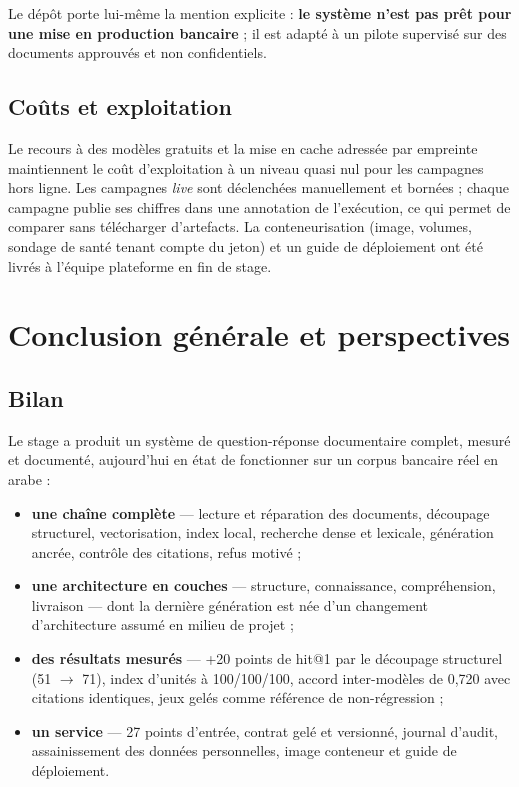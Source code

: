 \documentclass[a4paper,12pt]{report}
\begin{document}
Le dépôt porte lui-même la mention explicite : \textbf{le système n'est pas prêt pour une mise en
production bancaire} ; il est adapté à un pilote supervisé sur des documents approuvés et non
confidentiels.

\section{Coûts et exploitation}
Le recours à des modèles gratuits et la mise en cache adressée par empreinte maintiennent le coût
d'exploitation à un niveau quasi nul pour les campagnes hors ligne. Les campagnes \emph{live} sont
déclenchées manuellement et bornées ; chaque campagne publie ses chiffres dans une annotation de
l'exécution, ce qui permet de comparer sans télécharger d'artefacts. La conteneurisation (image,
volumes, sondage de santé tenant compte du jeton) et un guide de déploiement ont été livrés à
l'équipe plateforme en fin de stage.

\chapter*{Conclusion générale et perspectives}

\section*{Bilan}
Le stage a produit un système de question-réponse documentaire complet, mesuré et documenté,
aujourd'hui en état de fonctionner sur un corpus bancaire réel en arabe :

\begin{itemize}
  \item \textbf{une chaîne complète} — lecture et réparation des documents, découpage structurel,
        vectorisation, index local, recherche dense et lexicale, génération ancrée, contrôle des
        citations, refus motivé ;
  \item \textbf{une architecture en couches} — structure, connaissance, compréhension, livraison —
        dont la dernière génération est née d'un changement d'architecture assumé en milieu de
        projet ;
  \item \textbf{des résultats mesurés} — +20 points de hit@1 par le découpage structurel
        (51 $\rightarrow$ 71), index d'unités à 100/100/100, accord inter-modèles de 0,720 avec
        citations identiques, jeux gelés comme référence de non-régression ;
  \item \textbf{un service} — 27 points d'entrée, contrat gelé et versionné, journal d'audit,
        assainissement des données personnelles, image conteneur et guide de déploiement.
\end{itemize}
\end{document}
